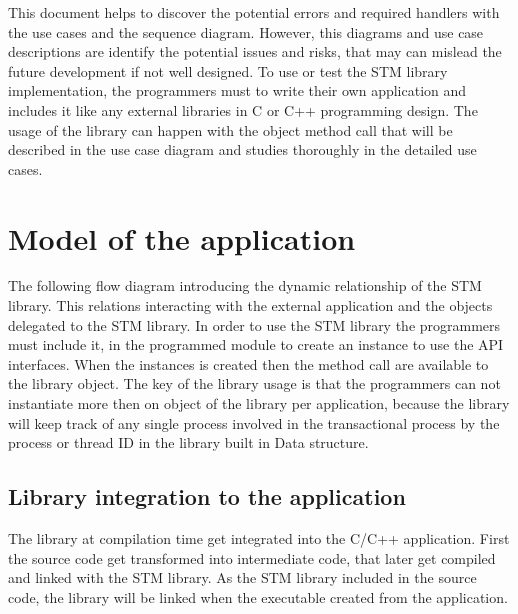 \documentclass[12pt]{article}
\begin{document}
This document helps to discover the potential errors and required handlers with the use cases and the sequence diagram. However, this diagrams and use case descriptions are identify the potential issues and risks, that may can mislead the future development if not well designed. To use or test the STM library implementation, the programmers must to write their own application and includes it like any external libraries in C or C++ programming design. The usage of the library can happen with the object method call that will be described in the use case diagram and studies thoroughly in the detailed use cases.\\
 
 
\newpage
\section{Model of the application}
The following flow diagram introducing the dynamic relationship of the STM library. This relations interacting with the external application and the objects delegated to the STM library. In order to use the STM library the programmers must include it, in the programmed module to create an instance to use the API interfaces. When the instances is created then the method call are available to the library object. The key of the library usage is that the programmers can not instantiate more then on object of the library per application, because the library will keep track of any single process involved in the transactional process by the process or thread ID in the library built in Data structure.

\subsection{Library integration to the application}
The library at compilation time get integrated into the C/C++ application. First the source code get transformed into intermediate code, that later get  compiled and linked with the STM library. As the STM library included in the source code, the library will be linked when the executable created from the application. \\
\end{document}
